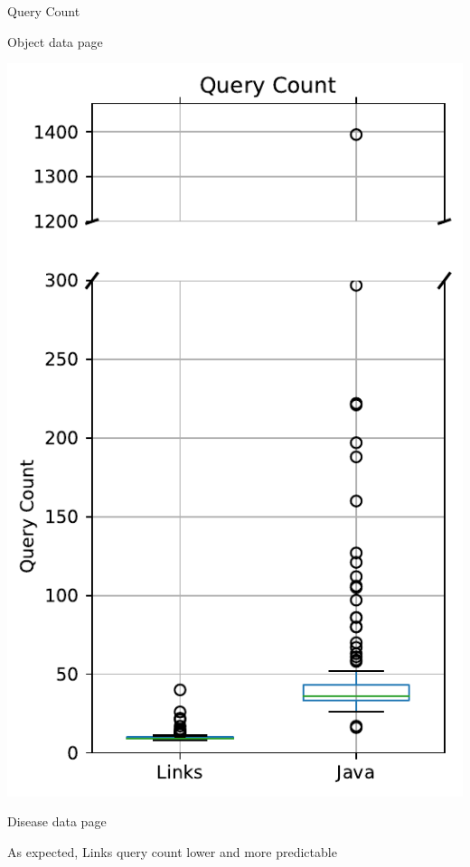 \documentclass[11.5pt, aspectratio=169]{beamer}
\begin{document}
\begin{frame}{Query Count}
\begin{minipage}[t]{0.45\textwidth}
    \begin{center}
      Object data page
    \end{center}
  \end{minipage}
  \hfill
  \begin{minipage}[t]{0.45\textwidth}
    \centering
    \includegraphics[scale=0.4]{images/diseasedisplay_querycount_box.pdf}

    \begin{center}
      Disease data page
    \end{center}
  \end{minipage}
  \vspace{1em}

  \begin{fullpageitemize}
  \itemR As expected, Links query count lower and more predictable
  \end{fullpageitemize}
\end{frame}
\end{document}
